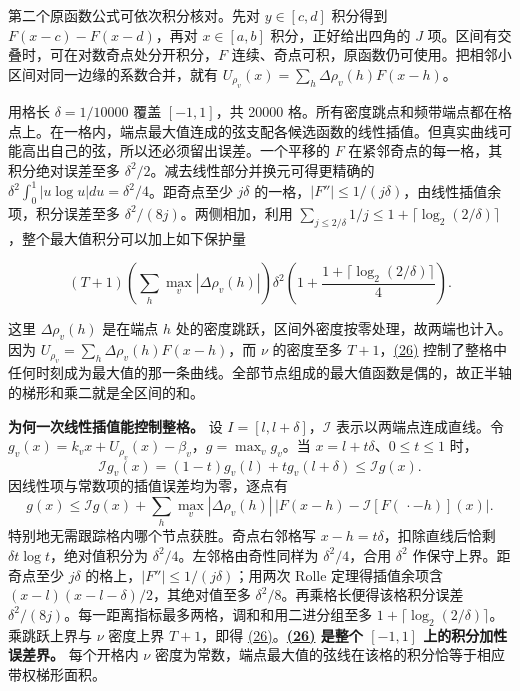 \documentclass[11pt,a4paper]{article}
\begin{document}
第二个原函数公式可依次积分核对。先对 \(y\in[c,d]\) 积分得到 \(F(x-c)-F(x-d)\)，再对 \(x\in[a,b]\) 积分，正好给出四角的 \(J\) 项。区间有交叠时，可在对数奇点处分开积分，\(F\) 连续、奇点可积，原函数仍可使用。把相邻小区间对同一边缘的系数合并，就有 \(U_{\rho_v}(x)=\sum_h\Delta\rho_v(h)F(x-h)\)。

用格长 \(\delta=1/10000\) 覆盖 \([-1,1]\)，共 20000 格。所有密度跳点和频带端点都在格点上。在一格内，端点最大值连成的弦支配各候选函数的线性插值。但真实曲线可能高出自己的弦，所以还必须留出误差。一个平移的 \(F\) 在紧邻奇点的每一格，其积分绝对误差至多 \(\delta^2/2\)。减去线性部分并换元可得更精确的 \(\delta^2\int_0^1|u\log u|du=\delta^2/4\)。距奇点至少 \(j\delta\) 的一格，\(|F''|\le1/(j\delta)\)，由线性插值余项，积分误差至多 \(\delta^2/(8j)\)。两侧相加，利用 \(\sum_{j\le2/\delta}1/j\le1+\lceil\log_2(2/\delta)\rceil\)，整个最大值积分可以加上如下保护量

\[
 (T+1)\left(\sum_h\max_v|\Delta\rho_v(h)|\right)
 \delta^2\left(1+\frac{1+\lceil\log_2(2/\delta)\rceil}{4}\right).           \tag{26}\label{eq:26}
\]

这里 \(\Delta\rho_v(h)\) 是在端点 \(h\) 处的密度跳跃，区间外密度按零处理，故两端也计入。因为 \(U_{\rho_v}=\sum_h\Delta\rho_v(h)F(x-h)\)，而 \(\nu\) 的密度至多 \(T+1\)，\hyperref[eq:26]{(26)} 控制了整格中任何时刻成为最大值的那一条曲线。全部节点组成的最大值函数是偶的，故正半轴的梯形和乘二就是全区间的和。

\textbf{为何一次线性插值能控制整格。} 设 \(I=[l,l+\delta]\)，\(\mathcal I\) 表示以两端点连成直线。令 \(g_v(x)=k_vx+U_{\rho_v}(x)-\beta_v\)，\(g=\max_vg_v\)。当 \(x=l+t\delta\)、\(0\le t\le1\) 时， \[
 \mathcal I g_v(x)=(1-t)g_v(l)+t g_v(l+\delta)\le\mathcal I g(x).
\] 因线性项与常数项的插值误差均为零，逐点有 \[
 g(x)\le\mathcal I g(x)+
 \sum_h \max_v|\Delta\rho_v(h)|\,\big|F(x-h)-\mathcal I[F(\,\cdot-h)](x)\big|.
\] 特别地无需跟踪格内哪个节点获胜。奇点右邻格写 \(x-h=t\delta\)，扣除直线后恰剩 \(\delta t\log t\)，绝对值积分为 \(\delta^2/4\)。左邻格由奇性同样为 \(\delta^2/4\)，合用 \(\delta^2\) 作保守上界。距奇点至少 \(j\delta\) 的格上，\(|F''|\le1/(j\delta)\)；用两次 Rolle 定理得插值余项含 \((x-l)(x-l-\delta)/2\)，其绝对值至多 \(\delta^2/8\)。再乘格长便得该格积分误差 \(\delta^2/(8j)\)。每一距离指标最多两格，调和和用二进分组至多 \(1+\lceil\log_2(2/\delta)\rceil\)。乘跳跃上界与 \(\nu\) 密度上界 \(T+1\)，即得 \hyperref[eq:26]{(26)}。\textbf{\hyperref[eq:26]{(26)} 是整个 \([-1,1]\) 上的积分加性误差界。} 每个开格内 \(\nu\) 密度为常数，端点最大值的弦线在该格的积分恰等于相应带权梯形面积。
\end{document}
